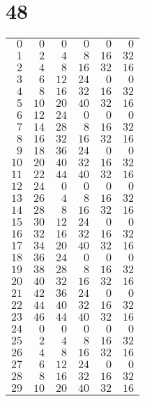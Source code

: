 \documentclass[a4paper]{scrartcl}
\begin{document}
\section*{48}
\begin{tabular}{rrrrrr}
\toprule
$0$ & $0$ & $0$ & $0$ & $0$ & $0$ \\
$1$ & $2$ & $4$ & $8$ & $16$ & $32$ \\
$2$ & $4$ & $8$ & $16$ & $32$ & $16$ \\
$3$ & $6$ & $12$ & $24$ & $0$ & $0$ \\
$4$ & $8$ & $16$ & $32$ & $16$ & $32$ \\
$5$ & $10$ & $20$ & $40$ & $32$ & $16$ \\
$6$ & $12$ & $24$ & $0$ & $0$ & $0$ \\
$7$ & $14$ & $28$ & $8$ & $16$ & $32$ \\
$8$ & $16$ & $32$ & $16$ & $32$ & $16$ \\
$9$ & $18$ & $36$ & $24$ & $0$ & $0$ \\
$10$ & $20$ & $40$ & $32$ & $16$ & $32$ \\
$11$ & $22$ & $44$ & $40$ & $32$ & $16$ \\
$12$ & $24$ & $0$ & $0$ & $0$ & $0$ \\
$13$ & $26$ & $4$ & $8$ & $16$ & $32$ \\
$14$ & $28$ & $8$ & $16$ & $32$ & $16$ \\
$15$ & $30$ & $12$ & $24$ & $0$ & $0$ \\
$16$ & $32$ & $16$ & $32$ & $16$ & $32$ \\
$17$ & $34$ & $20$ & $40$ & $32$ & $16$ \\
$18$ & $36$ & $24$ & $0$ & $0$ & $0$ \\
$19$ & $38$ & $28$ & $8$ & $16$ & $32$ \\
$20$ & $40$ & $32$ & $16$ & $32$ & $16$ \\
$21$ & $42$ & $36$ & $24$ & $0$ & $0$ \\
$22$ & $44$ & $40$ & $32$ & $16$ & $32$ \\
$23$ & $46$ & $44$ & $40$ & $32$ & $16$ \\
$24$ & $0$ & $0$ & $0$ & $0$ & $0$ \\
$25$ & $2$ & $4$ & $8$ & $16$ & $32$ \\
$26$ & $4$ & $8$ & $16$ & $32$ & $16$ \\
$27$ & $6$ & $12$ & $24$ & $0$ & $0$ \\
$28$ & $8$ & $16$ & $32$ & $16$ & $32$ \\
$29$ & $10$ & $20$ & $40$ & $32$ & $16$ \\

\end{tabular}
\end{document}
